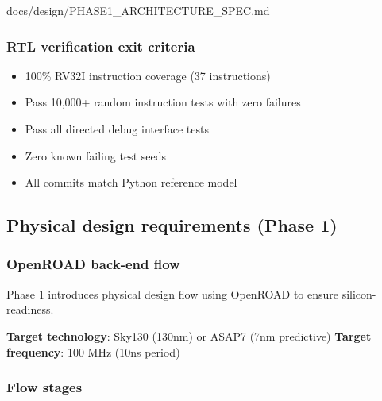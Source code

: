 \begin{relocated}{docs/design/PHASE1_ARCHITECTURE_SPEC.md}
\subsubsection{RTL verification exit criteria}\label{ds:ch:phase1-architecture:rtl-verification-exit-criteria}

\begin{itemize}
\tightlist
\item
  100\% RV32I instruction coverage (37 instructions)
\item
  Pass 10,000+ random instruction tests with zero failures
\item
  Pass all directed debug interface tests
\item
  Zero known failing test seeds
\item
  All commits match Python reference model
\end{itemize}

\subsection{Physical design requirements (Phase 1)}\label{ds:ch:phase1-architecture:physical-design-requirements-phase-1}

\subsubsection{OpenROAD back-end flow}\label{ds:ch:phase1-architecture:openroad-back-end-flow}

Phase 1 introduces physical design flow using OpenROAD to ensure
silicon-readiness.

\textbf{Target technology}: Sky130 (130nm) or ASAP7 (7nm predictive)
\textbf{Target frequency}: 100 MHz (10ns period)

\subsubsection{Flow stages}\label{ds:ch:phase1-architecture:flow-stages}


\end{relocated}
